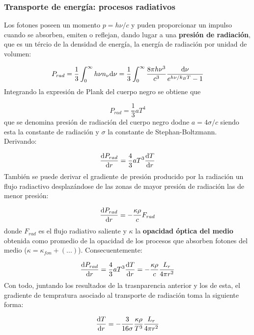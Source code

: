 \subsubsection{Transporte de energía: procesos radiativos}

Los fotones poseen un momento $p=h\nu/c$ y puden proporcionar un impulso cuando se absorben, emiten o reflejan, dando lugar a una \textbf{presión de radiación}, que es un tércio de la densidad de energía, la energía de radiación por unidad de volumen:

\begin{equation}
	P_{rad} = \frac{1}{3} \int_0^\infty h \nu n_\nu \mathrm{d} \nu = \frac{1}{3} \int_{0}^{\infty} \frac{8 \pi h \nu^3}{c^3} \frac{\mathrm{d} \nu}{e^{h\nu/k_BT}-1}
\end{equation}
Integrando la expresión de Plank del cuerpo negro se obtiene que

\begin{equation}
	P_{rad} = \frac{1}{3} a T^4
\end{equation}
que se denomina presión de radiación del cuerpo negro dodne $a=4\sigma/c$ siendo esta la constante de radiación y $\sigma$ la constante de Stephan-Boltzmann. Derivando:

\begin{equation}
	\frac{\mathrm{d} P_{rad}}{\mathrm{d} r} = \frac{4}{3} a T^3 \frac{\mathrm{d} T}{\mathrm{d} r}
\end{equation}
También se puede derivar el gradiente de presión producido por la radiación un flujo radiactivo desplazándose de las zonas de mayor presión de radiación las de menor presión:

\begin{equation}
	\frac{\mathrm{d} P_{rad}}{\mathrm{d} r} = - \frac{\kappa \rho}{c} F_{rad}
\end{equation}
donde $F_{rad}$ es el flujo radiativo saliente y $\kappa$ la \textbf{opacidad óptica del medio} obtenida como promedio de la opacidad de los procesos que absorben fotones del medio ($\kappa = \kappa_{fon} + (...)$). Consecuentemente:

\begin{equation}
	\frac{\mathrm{d} P_{rad}}{\mathrm{d} r} = \frac{4}{3} a T^3 \frac{\mathrm{d} T}{\mathrm{d} r} = - \frac{\kappa \rho}{c} \frac{L_r}{4\pi r^2}
\end{equation}
Con todo, juntando los resultados de la trasnparencia anterior y los de esta, el gradiente de tempratura asociado al transporte de radiación toma la siguiente forma:

\begin{equation}
	\frac{\mathrm{d} T}{\mathrm{d} r} = - \frac{3}{16 \sigma} \frac{\kappa \rho}{T^3} \frac{L_r}{4\pi r^2}
\end{equation}

